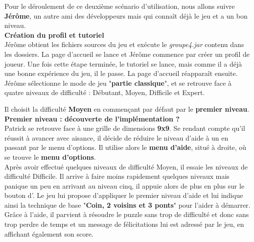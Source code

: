 \begin{mdframed}

Pour le déroulement de ce deuxième scénario d'utilisation, nous allons suivre \textbf{Jérôme}, un autre ami des développeurs mais qui connaît déjà le jeu et a un bon niveau.\\

\textbf{Création du profil et tutoriel}  \\
Jérôme obtient les fichiers sources du jeu et exécute le \textit{groupe4.jar} contenu dans les dossiers. La page d'accueil se lance et Jérôme commence par créer un profil de joueur. Une fois cette étape terminée, le tutoriel se lance, mais comme il a déjà une bonne expérience du jeu, il le passe. La page d'accueil réapparaît ensuite. Jérôme sélectionne le mode de jeu "\textbf{partie classique}", et se retrouve face à quatre niveaux de difficulté : Débutant, Moyen, Difficile et Expert.
    
Il choisit la difficulté \textbf{Moyen} en commençant par défaut par le \textbf{premier niveau}.\\

\textbf{Premier niveau : découverte de l'implémentation ?}  \\
Patrick se retrouve face à une grille de dimensions \textbf{9x9}. Se rendant compte qu'il réussit à avancer avec aisance, il décide de réduire le niveau d'aide à un en passant par le menu d'options. Il utilise alors le \textbf{menu d'aide}, situé à droite, où se trouve le \textbf{menu d'options}.\\
Après avoir effectué quelques niveaux de difficulté Moyen, il essaie les niveaux de difficulté Difficile.
Il arrive à faire moins rapidement quelques niveaux mais panique un peu en arrivant au niveau cinq, il appuie alors de plus en plus sur le bouton d'. Le jeu lui propose d’appliquer le premier niveau d'aide et lui indique ainsi la technique de base "\textbf{Coin, 2 voisins et 3 ponts}" pour l’aider à démarrer. Grâce à l'aide, il parvient à résoudre le puzzle sans trop de difficulté et donc sans trop perdre de temps et un message de félicitations lui est adressé par le jeu, en affichant également son score.\\

\end{mdframed}
